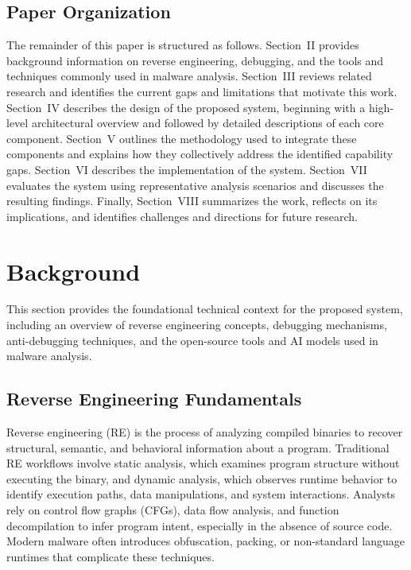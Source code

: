 \documentclass[conference]{IEEEtran}
\begin{document}
\subsection{Paper Organization}
The remainder of this paper is structured as follows. Section~II provides background information on reverse engineering, debugging, and the tools and techniques commonly used in malware analysis. Section~III reviews related research and identifies the current gaps and limitations that motivate this work. Section~IV describes the design of the proposed system, beginning with a high-level architectural overview and followed by detailed descriptions of each core component. Section~V outlines the methodology used to integrate these components and explains how they collectively address the identified capability gaps. Section~VI describes the implementation of the system. Section~VII evaluates the system using representative analysis scenarios and discusses the resulting findings. Finally, Section~VIII summarizes the work, reflects on its implications, and identifies challenges and directions for future research.


\section{Background}

This section provides the foundational technical context for the proposed system, including an overview of reverse engineering concepts, debugging mechanisms, anti-debugging techniques, and the open-source tools and AI models used in malware analysis.

\subsection{Reverse Engineering Fundamentals}

Reverse engineering (RE) is the process of analyzing compiled binaries to recover structural, semantic, and behavioral information about a program. Traditional RE workflows involve static analysis, which examines program structure without executing the binary, and dynamic analysis, which observes runtime behavior to identify execution paths, data manipulations, and system interactions. Analysts rely on control flow graphs (CFGs), data flow analysis, and function decompilation to infer program intent, especially in the absence of source code. Modern malware often introduces obfuscation, packing, or non-standard language runtimes that complicate these techniques.
\end{document}

